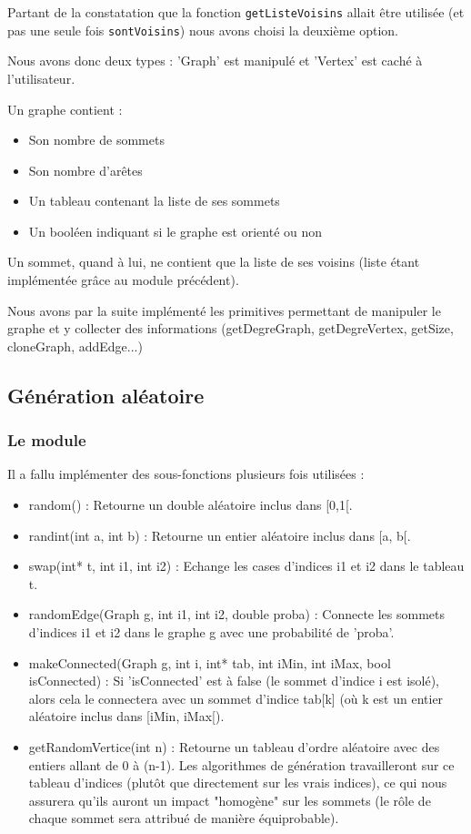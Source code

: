 \documentclass[a4paper,10pt]{article}
\newcommand*{\itemb}{\item[$\bullet$]}
\begin{document}
Partant de la constatation que la fonction \texttt{getListeVoisins} allait être utilisée (et pas une seule fois \texttt{sontVoisins}) nous avons choisi la deuxième option.

Nous avons donc deux types : 'Graph' est manipulé et 'Vertex' est caché à l'utilisateur.

Un graphe contient :
\begin{itemize}
\itemb Son nombre de sommets
\itemb Son nombre d'arêtes
\itemb Un tableau contenant la liste de ses sommets
\itemb Un booléen indiquant si le graphe est orienté ou non
\end{itemize}

Un sommet, quand à lui, ne contient que la liste de ses voisins (liste étant implémentée grâce au module précédent).

Nous avons par la suite implémenté les primitives permettant de manipuler le graphe et y collecter des informations (getDegreGraph, getDegreVertex, getSize, cloneGraph, addEdge...)

\subsection{Génération aléatoire}

\subsubsection{Le module}

Il a fallu implémenter des sous-fonctions plusieurs fois utilisées :
\begin{itemize}
	\itemb random() : Retourne un double aléatoire inclus dans [0,1[.
	\itemb randint(int a, int b) : Retourne un entier aléatoire inclus dans [a, b[.
	\itemb swap(int* t, int i1, int i2) : Echange les cases d'indices i1 et i2 dans le tableau t.
	\itemb randomEdge(Graph g, int i1, int i2, double proba) : Connecte les sommets d'indices i1 et i2 dans le graphe g avec une probabilité de 'proba'.
	\itemb makeConnected(Graph g, int i, int* tab, int iMin, int iMax, bool isConnected) : Si 'isConnected' est à false (le sommet d'indice i est isolé), alors cela le connectera avec un sommet d'indice tab[k] (où k est un entier aléatoire inclus dans [iMin, iMax[).
	\itemb getRandomVertice(int n) : Retourne un tableau d'ordre aléatoire avec des entiers allant de 0 à (n-1). Les algorithmes de génération travailleront sur ce tableau d'indices (plutôt que directement sur les vrais indices), ce qui nous assurera qu'ils auront un impact "homogène" sur les sommets (le rôle de chaque sommet sera attribué de manière équiprobable).
\end{itemize}
\end{document}
